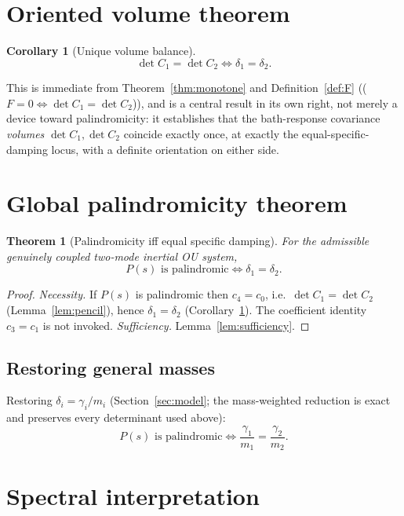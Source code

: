 \documentclass[11pt]{article}
\newtheorem{theorem}{Theorem}
\newtheorem{corollary}{Corollary}
\theoremstyle{definition}
\begin{document}
\section{Oriented volume theorem}
\label{sec:oriented}

\begin{corollary}[Unique volume balance]
\label{cor:balance}
\[
\det C_1 = \det C_2 \iff \delta_1=\delta_2.
\]
\end{corollary}

This is immediate from Theorem~\ref{thm:monotone} and Definition~\ref{def:F}
(($F=0\iff\det C_1=\det C_2$)), and is a central result in its own right,
not merely a device toward palindromicity: it establishes that the
bath-response covariance \emph{volumes} $\det C_1,\det C_2$ coincide
exactly once, at exactly the equal-specific-damping locus, with a definite
orientation on either side.

\section{Global palindromicity theorem}
\label{sec:main}

\begin{theorem}[Palindromicity iff equal specific damping]
\label{thm:main}
For the admissible genuinely coupled two-mode inertial OU system,
\[
P(s) \text{ is palindromic} \iff \delta_1=\delta_2.
\]
\end{theorem}

\begin{proof}
\emph{Necessity.} If $P(s)$ is palindromic then $c_4=c_0$, i.e.\ $\det
C_1=\det C_2$ (Lemma~\ref{lem:pencil}), hence $\delta_1=\delta_2$
(Corollary~\ref{cor:balance}). The coefficient identity $c_3=c_1$ is not
invoked. \emph{Sufficiency.} Lemma~\ref{lem:sufficiency}.
\end{proof}

\subsection{Restoring general masses}
\label{sec:restore}

Restoring $\delta_i=\gamma_i/m_i$ (Section~\ref{sec:model}; the
mass-weighted reduction is exact and preserves every determinant used
above):
\[
P(s)\text{ is palindromic} \iff \frac{\gamma_1}{m_1}=\frac{\gamma_2}{m_2}.
\]

\section{Spectral interpretation}
\end{document}
